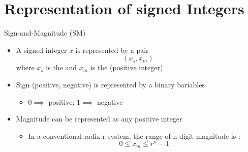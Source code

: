 \section{Representation of signed Integers}
\begin{parag}{Sign-and-Magnitude (SM)}
    \begin{itemize}
        \item A signed integer $x$ is represented by a pair
        \[(x_s, x_m)\]
        where $x_s$ is the  and $x_m$ is the  (positive integer)
        \item Sign (positive, negative) is represented by a binary bariables 
        \begin{itemize}
            \item $0 \implies$ positive; $1 \implies $ negative
        \end{itemize}
        \item Magnitude can be represented as any positive integer
        \begin{itemize}
            \item In a conventional radix-r system, the range of n-digit magnitude is :
            \[0 \leq x_m \leq r^n - 1\]
        \end{itemize}
    \end{itemize}
\end{parag}